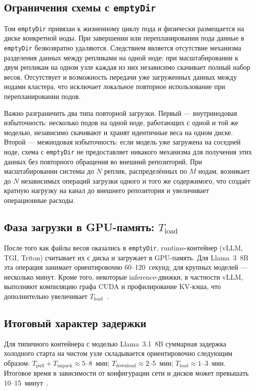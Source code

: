 \subsection{Ограничения схемы с \texttt{emptyDir}}

Том \texttt{emptyDir} привязан к жизненному циклу пода и физически размещается на диске конкретной ноды. При завершении или перепланировании пода данные в \texttt{emptyDir} безвозвратно удаляются. Следствием является отсутствие механизма разделения данных между репликами на одной ноде: при масштабировании к двум репликам на одном узле каждая из них независимо скачивает полный набор весов. Отсутствует и возможность передачи уже загруженных данных между нодами кластера, что исключает локальное повторное использование при перепланировании подов.

Важно разграничить два типа повторной загрузки. Первый --- внутринодовая избыточность: несколько подов на одной ноде, работающих с одной и той же моделью, независимо скачивают и хранят идентичные веса на одном диске. Второй --- межнодовая избыточность: если модель уже загружена на соседней ноде, схема с \texttt{emptyDir} не предоставляет никакого механизма для получения этих данных без повторного обращения во внешний репозиторий. При масштабировании системы до $N$ реплик, распределённых по $M$ нодам, возникает до $N$ независимых операций загрузки одного и того же содержимого, что создаёт кратную нагрузку на канал до внешнего репозитория и увеличивает операционные расходы.

\subsection{Фаза загрузки в GPU-память: $T_{\mathrm{load}}$}

После того как файлы весов оказались в \texttt{emptyDir}, runtime-контейнер (vLLM, TGI, Triton) считывает их с диска и загружает в GPU-память. Для Llama~3~8B эта операция занимает ориентировочно 60--120~секунд; для крупных моделей --- несколько минут. Кроме того, некоторые inference-движки, в частности vLLM, выполняют компиляцию графа CUDA и профилирование KV-кэша, что дополнительно увеличивает $T_{\mathrm{load}}$~\cite{bentoml2024cold}.

\subsection{Итоговый характер задержки}

Для типичного контейнера с моделью Llama~3.1~8B суммарная задержка холодного старта на чистом узле складывается ориентировочно следующим образом: $T_{\mathrm{pull}} + T_{\mathrm{unpack}} \approx 5$--8~мин; $T_{\mathrm{download}} \approx 2$--5~мин; $T_{\mathrm{load}} \approx 1$--3~мин. Итоговое время в зависимости от конфигурации сети и дисков может превышать 10--15~минут~\cite{bentoml2024cold}.

